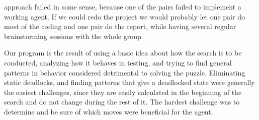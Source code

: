\documentclass[article,11pt]{article}
\begin{document}
approach failed in some sense, because one of the pairs failed to
implement a working agent. If we could redo the project we would
probably let one pair do most of the coding and one pair do the
report, while having several regular brainstorming sessions with the
whole group.

Our program is the result of using a basic idea about how the search
is to be conducted, analyzing how it behaves in testing, and trying to
find general patterns in behavior considered detrimental to solving
the puzzle. Eliminating static deadlocks, and finding patterns that
give a deadlocked state were generally the easiest challenges, since
they are easily calculated in the beginning of the search and do not
change during the rest of it. The hardest challenge was to determine
and be sure of which moves were beneficial for the agent. 
\end{document}
